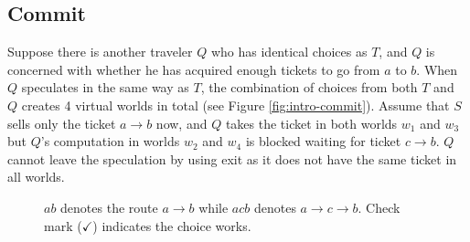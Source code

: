\subsection{Commit}

Suppose there is another traveler $Q$ who has identical choices as $T$,
and $Q$ is concerned with whether he has acquired enough tickets to go
from $a$ to $b$. 
When $Q$ speculates in the same way as $T$, 
the combination of choices from both $T$ and $Q$ 
creates 4 virtual worlds in total (see Figure \ref{fig:intro-commit}).
Assume that $S$ sells only the ticket $a\to b$ now, and
$Q$ takes the ticket in both worlds $w_1$ and $w_3$ but
$Q$'s computation in worlds $w_2$ and $w_4$ is blocked waiting for ticket
$c\to b$.
$Q$ cannot leave the speculation by using exit as it does not have the same ticket in all worlds.

\begin{figure}[thb]
\quad
{}
\caption{$ab$ denotes the route $a\to b$ while $acb$ denotes $a\to c\to b$. Check mark ($\checkmark$) indicates the choice works.}
\end{figure}

